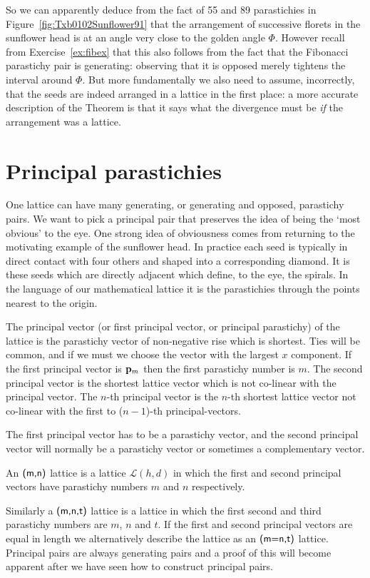 So we can apparently deduce from the fact of 55 and 89 parastichies in Figure~\ref{fig:Txb0102Sunflower91} that the arrangement of successive florets in the sunflower head is at an angle very close to the golden angle $\Phi$. However recall from Exercise~\ref{ex:fibex} that this also follows from the fact that the Fibonacci parastichy pair is generating: observing that it is opposed merely tightens the interval around $\Phi$. But more fundamentally we also need to assume, incorrectly, that the seeds are indeed arranged in a lattice in the first place: a more accurate description of the Theorem is that it says what the divergence must be \textit{if} the arrangement was a lattice. 

\section{Principal parastichies}

\label{sec:ppair}
One lattice can have many generating, or generating and opposed, parastichy pairs.  We want to pick a principal pair that preserves the idea of being the `most obvious' to the eye. 
One strong idea of obviousness comes from returning to the motivating example of the sunflower head. In practice each seed is typically in direct contact with four others and shaped into a corresponding diamond. It is these seeds which are directly adjacent which define, to the eye, the spirals. 
In the language of our mathematical lattice it is the parastichies through the points nearest to the origin.
\begin{definition}
	The principal vector (or first principal vector, or principal parastichy) of the lattice is the parastichy vector of non-negative rise which is shortest. Ties will be common, and if we must we choose the vector with the largest $x$ component.
	If the first principal vector is ${\mathbf p}_{m}$ then the first parastichy number is $m$.  The second principal vector  is the shortest lattice vector which is not co-linear with the principal vector. The $n$-th principal vector is the $n$-th  shortest lattice vector not co-linear with the first to ($n-1$)-th principal-vectors.%
	
\end{definition}
The first principal vector has to be a parastichy vector, and the second principal vector will normally be a parastichy vector or sometimes a complementary vector.
\begin{definition}
	An  $\textsf{(m,n)}$ lattice is a lattice $\mathcal{L}(h,d)$ in which the first and second principal vectors have parastichy numbers $m$ and $n$ respectively. 
\end{definition}
Similarly a  $\textsf{(m,n,t)}$ lattice is a lattice  in which the first  second  and third parastichy numbers are $m$, $n$ and $t$. If the first and second principal  vectors are equal in length we alternatively describe the lattice as an $\textsf{(m=n,t)}$ lattice.
Principal pairs are always generating pairs and a proof of this will become apparent after we have seen how to construct principal pairs. 


